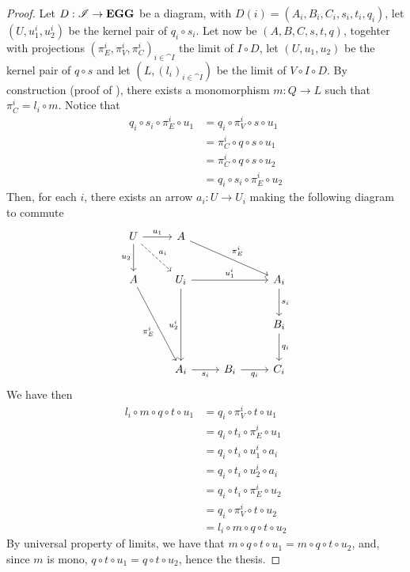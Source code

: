 \begin{proof}
	Let $D: \mathscr{I} \to \mathbf{EGG}$ be a diagram, with $D(i) = (A_i, B_i, C_i, s_i, t_i, q_i)$, let $(U, u_1^i, u_2^i)$ be the kernel pair of $q_i\circ s_i$. Let now be $(A, B, C, s, t, q)$, togehter with projections $(\pi_E^i, \pi_V^i, \pi_C^i)_{i \in \cat I}$ the limit of $I \circ D$, let $(U, u_1, u_2)$ be the kernel pair of $q\circ s$ and let $(L, (l_i)_{i \in \cat I})$ be the limit of $V\circ I\circ D$.
	By construction (proof of ), there exists a monomorphism $m: Q \to L$ such that $\pi_C^i = l_i \circ m$. Notice that
	\begin{align*}
		q_i\circ s_i\circ \pi^i_E\circ u_1 	&= q_i\circ \pi^i_V\circ s\circ u_1\\
							&= \pi_C^i\circ q\circ s\circ u_1\\
							&=\pi_C^i\circ q\circ s\circ u_2\\
							&= q_i \circ s_i \circ \pi_E^i \circ u_2
	\end{align*}
	Then, for each $i$, there exists an arrow $a_i:U\to U_i$ making the following diagram to commute
	\[
		\begin{tikzcd}[row sep = 25, column sep = 25]
			U \ar[r, "{u_1}"] \ar[d, "{u_2}"swap] \ar[dr, dashed, "{a_i}"] & A \ar[drr, "{\pi_E^i}"] && \\
			A \ar[ddr, "{\pi_E^i}"swap] & U_i \ar[rr, "{u_1^i}"] \ar[dd, "{u_2^i}"swap]&& A_i \ar[d, "{s_i}"] \\
			& & & B_i \ar[d, "{q_i}"]\\
			& A_i \ar[r, "{s_i}"swap] & B_i \ar[r, "{q_i}"swap] & C_i
		\end{tikzcd}
	\]
	We have then
	\begin{align*}
		l_i\circ m \circ q \circ t \circ u_1	&= q_i \circ \pi_V^i \circ t \circ u_1 \\
							&= q_i \circ t_i \circ \pi_E^i \circ u_1 \\
							&= q_i \circ t_i \circ u_1^i \circ a_i \\
							&= q_i \circ t_i \circ u_2^i \circ a_i \\
							&= q_i \circ t_i \circ \pi_E^i \circ u_2 \\
							&= q_i \circ \pi_V^i \circ t \circ u_2 \\
							&= l_i \circ m \circ q \circ t \circ u_2
	\end{align*}
	By universal property of limits, we have that \- $m\circ q \circ t \circ u_1 = m \circ q \circ t \circ u_2$, and, since $m$ is mono, $q \circ t \circ u_1 = q \circ t \circ u_2$, hence the thesis.
\end{proof}

